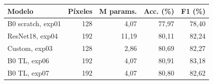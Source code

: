 \begin{tabular}{@{}lrrrr@{}}
\toprule
\textbf{Modelo} & \textbf{Píxeles} & \textbf{M params.} & \textbf{Acc. (\%)} & \textbf{F1 (\%)} \\
\midrule
B0 scratch, exp01 & 128 & 4,07 & 77,97 & 78,40 \\
ResNet18, exp04 & 192 & 11,19 & 80,11 & 82,24 \\
Custom, exp03 & 128 & 2,86 & 80,69 & 82,27 \\
B0 TL, exp06 & 192 & 4,07 & 80,91 & 83,18 \\
B0 TL, exp07 & 192 & 4,07 & 80,80 & 82,62 \\
\bottomrule
\end{tabular}
